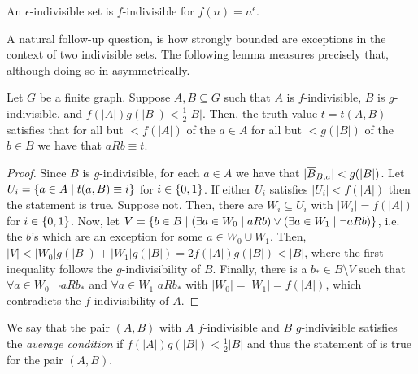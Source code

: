     \begin{remark}
        An $\epsilon$-indivisible set is $f$-indivisible for $f(n) = n^\epsilon$.
    \end{remark} 

    A natural follow-up question, is how strongly bounded are exceptions in the context of two indivisible sets.
    The following lemma measures precisely that, although doing so in asymmetrically.

    \begin{lemma}[Claim 4.6)] \label{lem:average_condition_statement}
        Let $G$ be a finite graph.
        Suppose $A, B \subseteq G$ such that $A$ is $f$-indivisible, $B$ is $g$-indivisible, and $f(|A|) g(|B|) < \frac{1}{2} |B|$.
        Then, the truth value $t = t(A,B)$ satisfies that for all but $< f(|A|)$ of the $a \in A$ for all but $< g(|B|)$ of
        the $b \in B$ we have that $a R b \equiv t$.
        \begin{proof}
            Since $B$ is $g$-indivisible, for each $a \in A$ we have that $| \overline{B}_{B,a} | < g(|B|)$.
            Let $U_i = \{ a \in A \mid t(a,B) \equiv i \}$ for $i \in \{ 0,1 \}$.
            If either $U_i$ satisfies $|U_i| < f(|A|)$ then the statement is true.
            Suppose not.
            Then, there are $W_i \subseteq U_i$ with $|W_i| = f(|A|)$ for $i \in \{ 0,1 \}$.
            Now, let $V = \{ b \in B \mid (\exists a \in W_0 \mid a R b) \vee (\exists a \in W_1 \mid \lnot a R b) \}$,
            i.e. the $b$'s which are an exception for some $a \in W_0 \cup W_1$.
            Then, $|V| < |W_0| g(|B|) + |W_1| g(|B|) = 2 f(|A|) g(|B|) < |B|$, where the first inequality follows the
            $g$-indivisibility of $B$.
            Finally, there is a $b_* \in B \setminus V$ such that $\forall a \in W_0$ $\lnot a R b_*$ and
            $\forall a \in W_1$ $a R b_*$ with $|W_0| = |W_1| = f(|A|)$, which contradicts the $f$-indivisibility of $A$.
        \end{proof}
    \end{lemma}

    \begin{definition}
        We say that the pair $(A,B)$ with $A$ $f$-indivisible and $B$ $g$-indivisible satisfies the \emph{average condition} if
        $f(|A|) g(|B|) < \frac{1}{2} |B|$ and thus the statement of  is true for
        the pair $(A,B)$.
    \end{definition}

